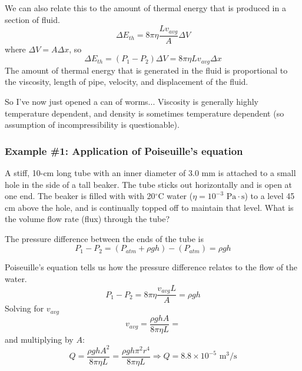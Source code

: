 We can also relate this to the amount of thermal energy that is produced in a section of fluid.
$$\Delta E_{th}=8\pi\eta\frac{Lv_{avg}}{A}\Delta{V}$$
where $\Delta{V}=A\Delta x$, so
$$\Delta E_{th}=(P_1-P_2)\Delta V = 8\pi\eta Lv_{avg}\Delta{x}$$
The amount of thermal energy that is generated in the fluid is proportional to the viscosity, length of pipe, velocity, and displacement of the fluid.

So I've now just opened a can of worms... Viscosity is generally highly temperature dependent, and density is sometimes temperature dependent (so assumption of incompressibility is questionable).

\subsubsection{Example \#1: Application of Poiseuille's equation}
A stiff, 10-cm long tube with an inner diameter of 3.0 mm is attached to a small hole in the side of a tall beaker. The tube sticks out horizontally and is open at one end. The beaker is filled with with 20$^\circ$C water ($\eta=10^{-3}\mbox{ Pa}\cdot\mbox{s}$) to a level 45 cm above the hole, and is continually topped off to maintain that level. What is the volume flow rate (flux) through the tube?

The pressure difference between the ends of the tube is
$$P_1-P_2=(P_{atm}+\rho gh)-(P_{atm})=\rho gh$$

Poiseuille's equation tells us how the pressure difference relates to the flow of the water.
$$P_1-P_2=8\pi\eta\frac{v_{avg}L}{A}=\rho gh$$
Solving for $v_{avg}$ 
$$v_{avg}=\frac{\rho ghA}{8\pi\eta L}=$$
and multiplying by $A$:
$$Q=\frac{\rho ghA^2}{8\pi\eta L}=\frac{\rho gh\pi^2r^4}{8\pi\eta L}\Rightarrow\boxed{Q=8.8\times 10^{-5}\mbox{ m}^3/\mbox{s}}$$



\clearpage
